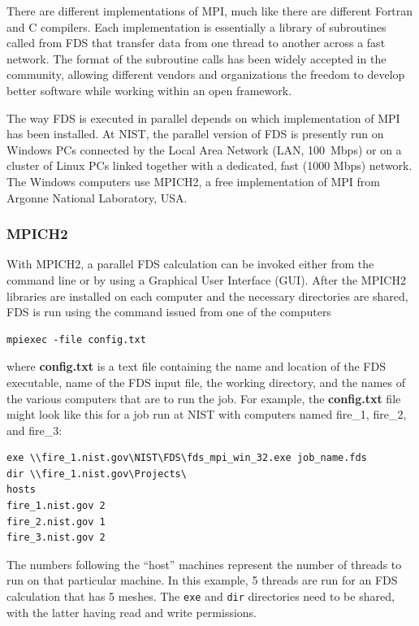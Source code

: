 \documentclass[11pt]{book}
\newcommand{\ct}{\tt\small}
\begin{document}
There are different implementations of MPI, much like there
are different Fortran and C compilers. Each implementation is
essentially a library of subroutines called from FDS that transfer
data from one thread to another across a fast network. The format of
the subroutine calls has been widely accepted in the community,
allowing different vendors and organizations the freedom to develop
better software while working within an open framework.

The way FDS is executed in parallel depends on which implementation of
MPI has been installed.  At NIST, the parallel version of FDS is
presently run on Windows PCs connected by the Local Area Network (LAN,
100~Mbps) or on a cluster of Linux PCs linked together with a
dedicated, fast (1000 Mbps) network.  The Windows computers use
MPICH2, a free implementation of MPI from Argonne National Laboratory,
USA.

\subsubsection{MPICH2}

With MPICH2, a parallel FDS calculation can be invoked either
from the command line or by using a Graphical User Interface
(GUI). After the MPICH2 libraries are installed on each computer and
the necessary directories are shared, FDS is run using the command
issued from one of the computers
\begin{verbatim}
mpiexec -file config.txt
\end{verbatim}
where {\bf config.txt} is a text file containing the name and location
of the FDS executable, name of the FDS input file, the working directory,
and the names of the various computers that are to run the job. For
example, the {\bf config.txt} file might look like this for a job run at NIST with computers named
fire\_1, fire\_2, and fire\_3:
\begin{verbatim}
exe \\fire_1.nist.gov\NIST\FDS\fds_mpi_win_32.exe job_name.fds
dir \\fire_1.nist.gov\Projects\
hosts
fire_1.nist.gov 2
fire_2.nist.gov 1
fire_3.nist.gov 2
\end{verbatim}
The numbers following the ``host'' machines represent the number of threads to run on that particular machine. In this
example, 5 threads are run for an FDS calculation that has 5 meshes. The {\ct exe} and {\ct dir} directories need to be shared, with the
latter having read and write permissions.
\end{document}
